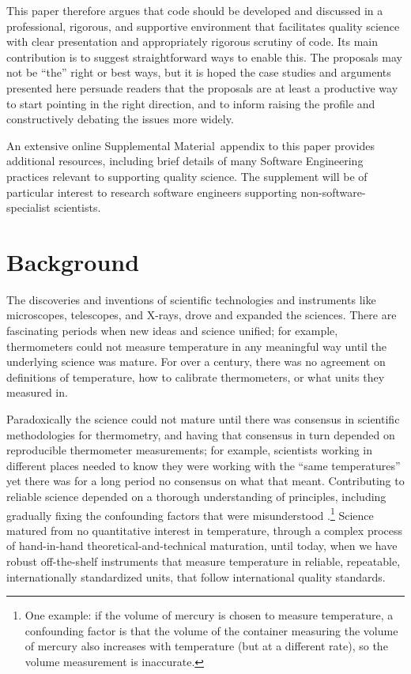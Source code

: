 \documentclass{comjnl}
\def\supplement{Supplemental Material}
\begin{document}
This paper therefore argues that code should be developed and discussed in a professional, rigorous, and supportive environment that facilitates quality science with clear presentation and appropriately rigorous scrutiny of code. Its main contribution is to suggest straightforward ways to enable this. The proposals may not be ``the'' right or best ways, but it is hoped the case studies and arguments presented here persuade readers that the proposals are at least a productive way to start pointing in the right direction, and to inform raising the profile and constructively debating the issues more widely. 

An extensive online \supplement\ appendix to this paper provides additional resources, including brief details of many Software Engineering practices relevant to supporting quality science. The supplement will be of particular interest to research software engineers supporting non-software-specialist scientists.

\section{Background}
The discoveries and inventions of scientific technologies and instruments like microscopes, telescopes, and X-rays, drove and expanded the sciences. There are fascinating periods when new ideas and science unified; for example, thermometers could not measure temperature in any meaningful way until the underlying science was mature. For over a century, there was no agreement on definitions of temperature, how to calibrate thermometers, or what units they measured in. 

Paradoxically the science could not mature until there was consensus in scientific methodologies for thermometry, and having that consensus in turn depended on reproducible thermometer measurements; for example, scientists working in different places needed to know they were working with the ``same temperatures'' yet there was for a long period no consensus on what that meant. Contributing to reliable science depended on a thorough understanding of principles, including gradually fixing the confounding factors that were misunderstood \cite{temperature}.\footnote{One example: if the volume of mercury is chosen to measure temperature, a confounding factor is that the volume of the container measuring the volume of mercury also increases with temperature (but at a different rate), so the volume measurement is inaccurate.} 
Science matured from no quantitative interest in temperature, through a complex process of hand-in-hand theoretical-and-technical maturation, until today, when we have robust off-the-shelf instruments that measure temperature in reliable, repeatable, internationally standardized units, that follow international quality standards.
\end{document}
